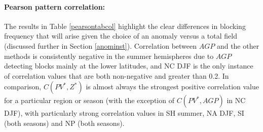 \documentclass[smallextended]{svjour3}       %
\numberwithin{equation}{section}
\begin{document}
\paragraph{Pearson pattern correlation:} The results in Table \ref{pearsontabcol} highlight the clear differences in blocking frequency that will arise given the choice of an anomaly versus a total field (discussed further in Section \ref{anominst}). Correlation between $AGP$ and the other methods is consistently negative in the summer hemispheres due to $AGP$ detecting blocks mainly at the lower latitudes, and NC DJF is the only instance of correlation values that are both non-negative and greater than 0.2. In comparison, $C(PV^*, Z^*)$ is almost always the strongest positive correlation value for a particular region or season (with the exception of $C(PV^*, AGP)$ in NC DJF), with particularly strong correlation values in SH summer, NA DJF, SI (both seasons) and NP (both seasons).
\end{document}
